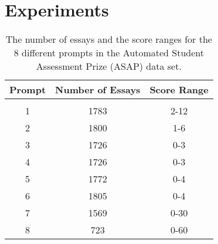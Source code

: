 \documentclass[11pt,a4paper]{article}
\begin{document}
\vspace*{-0.1cm} 
\section{Experiments}
\label{sec_Polarity_Experiments}

\begin{table}[!t]
\setlength\tabcolsep{5.5pt}
\begin{center}
\begin{tabular}{ccc}
\hline
Prompt 				& Number of Essays		&	Score Range	\\
\hline
\hline
\vspace{-0.9em}\\
1							& 1783						& 2-12\\
2							& 1800 						& 1-6\\											
3							& 1726						& 0-3\\													
4							& 1726						& 0-3\\																							
5							& 1772						& 0-4\\
6							& 1805						& 0-4\\
7							& 1569						& 0-30\\
8							& 723						& 0-60\\
\hline
\end{tabular}
\end{center}
\vspace*{-0.2cm}
\caption{The number of essays and the score ranges for the 8 different prompts in the Automated Student Assessment Prize (ASAP) data set.}
\label{tab_asap}
\vspace*{-0.3cm}
\end{table}
\end{document}
